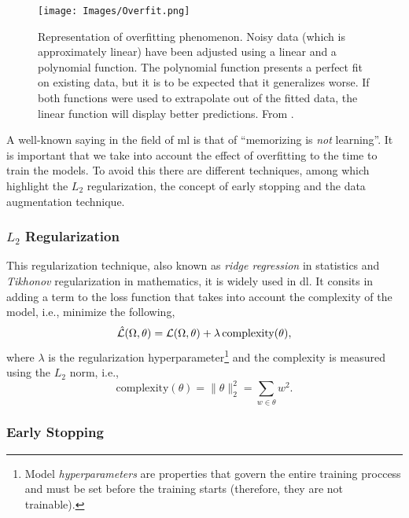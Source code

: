 \begin{figure}[ht]
  \centering
  \texttt{[image: Images/Overfit.png]}
  \caption[Representation of the overfitting phenomenon.]{Representation of
    overfitting phenomenon. Noisy data (which is approximately linear) have
    been adjusted using a linear and a polynomial function. The polynomial
    function presents a perfect fit on existing data, but it is to be expected
    that it generalizes worse. If both functions were used to extrapolate out
    of the fitted data, the linear function will display better
    predictions. From .}\label{fig:overfit}
\end{figure}

A well-known saying in the field of \gls{ml} is that of ``memorizing is
\emph{not} learning''. It is important that we take into account the effect of
overfitting to the time to train the models. To avoid this there are different
techniques, among which highlight the \(L_2\) regularization, the concept of
early stopping and the data augmentation technique.

\subsubsection{\(L_2\) Regularization}

This regularization technique, also known as \emph{ridge
  regression} in statistics and
\emph{Tikhonov} regularization in mathematics, it is
widely used in \gls{dl}. It consits in adding a term to the loss function that
takes into account the complexity of the model, i.e., minimize the following,
\begin{equation}
  \hat{\mathcal{L}}(\Omega, \theta) =
  \mathcal{L}(\Omega, \theta) + \lambda\,\text{complexity}(\theta),
\end{equation}
where \(\lambda\) is the regularization hyperparameter\footnote{Model
  \emph{hyperparameters} are properties that govern the entire training
  proccess and must be set before the training starts (therefore, they are not
  trainable).} and the complexity is measured using the
\(L_2\) norm, i.e.,
\begin{equation}
  \text{complexity}(\theta) = \lVert\theta\rVert_2^2 = \sum_{w \in \theta} w^2.
\end{equation}

\subsubsection{Early Stopping}

